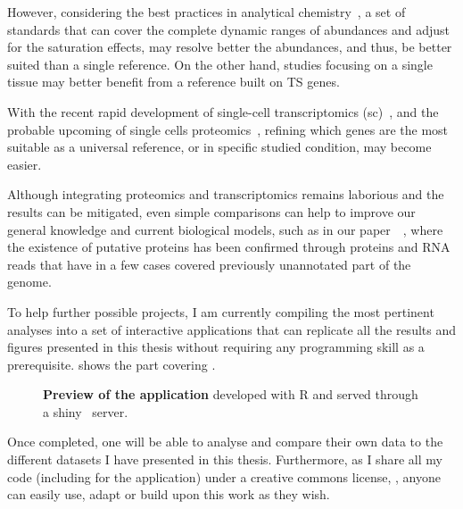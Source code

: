 However,
considering the best practices in analytical chemistry~,
a set of standards that can cover the complete dynamic ranges of abundances
and adjust for the saturation effects,
may resolve better the abundances, and thus, be better suited than a single reference.
On the other hand, studies focusing on a single tissue
may better benefit from a reference built on \gls{TS} genes.

With the recent rapid development of
single-cell transcriptomics (sc\Rnaseq)~,
and the probable upcoming of single cells proteomics~,
refining which genes are the most suitable as a universal reference,
or in specific studied condition, may become easier.\mybr\

Although integrating proteomics and transcriptomics remains laborious
and the results can be mitigated,
even simple comparisons can help to improve our general knowledge
and current biological models,
such as in our paper~~,
where the existence of putative proteins has been confirmed through proteins
and \gls{RNA} reads that have in a few cases covered
previously unannotated part of the genome.\mybr\

To help further possible projects,
I am currently compiling the most pertinent analyses
into a set of interactive applications
that can replicate all the results and figures presented in this thesis
without requiring any programming skill as a prerequisite.
 shows the part covering .

\begin{figure}[!ht]
    \centering
    \vspace{-2mm}
    \caption[Application preview]{\label{fig:demoApp}\textbf{Preview of the
    application} developed with \textsf{R}
    and served through a shiny~ server.}
\end{figure}

Once completed, one will be able to analyse and compare their own data
to the different datasets I have presented in this thesis.
Furthermore, as I share all my code (including for the application)
under a creative commons license,
,
anyone can easily use, adapt or build upon this work as they wish.


